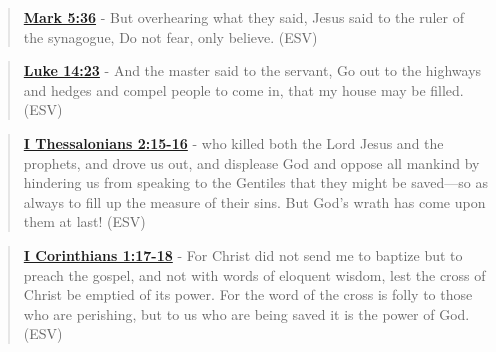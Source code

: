 \documentclass[11pt]{article}
\begin{document}
\begin{quote}
\textbf{\href{https://www.biblegateway.com/passage/?search=Mark\%205\%3A36\&version=ESV}{Mark 5:36}} - But overhearing what they said, Jesus said to the ruler of the synagogue, Do not fear, only believe. (ESV)
\end{quote}

\begin{quote}
\textbf{\href{https://www.biblegateway.com/passage/?search=Luke\%2014\%3A23\&version=ESV}{Luke 14:23}} - And the master said to the servant, Go out to the highways and hedges and compel people to come in, that my house may be filled. (ESV)
\end{quote}

\begin{quote}
\textbf{\href{https://www.biblegateway.com/passage/?search=1\%20Thessalonians\%202\%3A15-16\&version=ESV}{I Thessalonians 2:15-16}} - who killed both the Lord Jesus and the prophets, and drove us out, and displease God and oppose all mankind by hindering us from speaking to the Gentiles that they might be saved—so as always to fill up the measure of their sins. But God's wrath has come upon them at last! (ESV)
\end{quote}

\begin{quote}
\textbf{\href{https://www.biblegateway.com/passage/?search=1\%20Corinthians\%201\%3A17-18\&version=ESV}{I Corinthians 1:17-18}} - For Christ did not send me to baptize but to preach the gospel, and not with words of eloquent wisdom, lest the cross of Christ be emptied of its power. For the word of the cross is folly to those who are perishing, but to us who are being saved it is the power of God. (ESV)
\end{quote}
\end{document}
